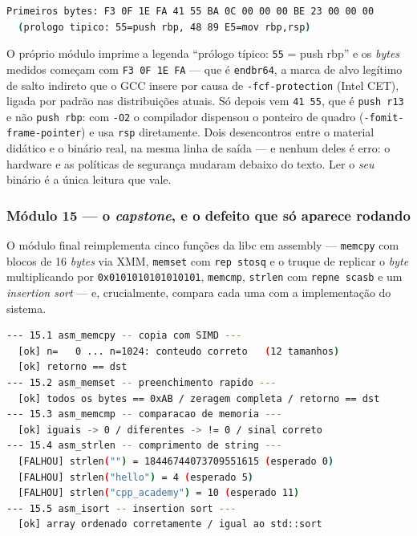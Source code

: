 \begin{lstlisting}[style=bt, language=bash,
    caption={Saída medida de \texttt{dist/bin/asm\_14\_disassembly}: os
             primeiros \emph{bytes} de uma função real deste repositório.}]
  Primeiros bytes: F3 0F 1E FA 41 55 BA 0C 00 00 00 BE 23 00 00 00
  (prologo tipico: 55=push rbp, 48 89 E5=mov rbp,rsp)
\end{lstlisting}

\begin{armadilha}
O próprio módulo imprime a legenda ``prólogo típico: \texttt{55} = push rbp'' e
os \emph{bytes} medidos começam com \texttt{F3 0F 1E FA} --- que é
\texttt{endbr64}, a marca de alvo legítimo de salto indireto que o GCC insere
por causa de \texttt{-fcf-protection} (Intel CET), ligada por padrão nas
distribuições atuais. Só depois vem \texttt{41 55}, que é \texttt{push r13} e
não \texttt{push rbp}: com \texttt{-O2} o compilador dispensou o ponteiro de
quadro (\texttt{-fomit-frame-pointer}) e usa \texttt{rsp} diretamente. Dois
desencontros entre o material didático e o binário real, na mesma linha de
saída --- e nenhum deles é erro: o hardware e as políticas de segurança
mudaram debaixo do texto. Ler o \emph{seu} binário é a única leitura que vale.
\end{armadilha}

\subsubsection{Módulo 15 --- o \emph{capstone}, e o defeito que só aparece rodando}

O módulo final reimplementa cinco funções da libc em assembly ---
\texttt{memcpy} com blocos de 16 \emph{bytes} via XMM, \texttt{memset} com
\texttt{rep stosq} e o truque de replicar o \emph{byte} multiplicando por
\texttt{0x0101010101010101}, \texttt{memcmp}, \texttt{strlen} com
\texttt{repne scasb} e um \emph{insertion sort} --- e, crucialmente, compara
cada uma com a implementação do sistema.

\begin{lstlisting}[style=bt, language=bash,
    caption={Saída medida de \texttt{dist/bin/asm\_15\_capstone}, recortada.}]
--- 15.1 asm_memcpy -- copia com SIMD ---
  [ok] n=   0 ... n=1024: conteudo correto   (12 tamanhos)
  [ok] retorno == dst
--- 15.2 asm_memset -- preenchimento rapido ---
  [ok] todos os bytes == 0xAB / zeragem completa / retorno == dst
--- 15.3 asm_memcmp -- comparacao de memoria ---
  [ok] iguais -> 0 / diferentes -> != 0 / sinal correto
--- 15.4 asm_strlen -- comprimento de string ---
  [FALHOU] strlen("") = 18446744073709551615 (esperado 0)
  [FALHOU] strlen("hello") = 4 (esperado 5)
  [FALHOU] strlen("cpp_academy") = 10 (esperado 11)
--- 15.5 asm_isort -- insertion sort ---
  [ok] array ordenado corretamente / igual ao std::sort
\end{lstlisting}

